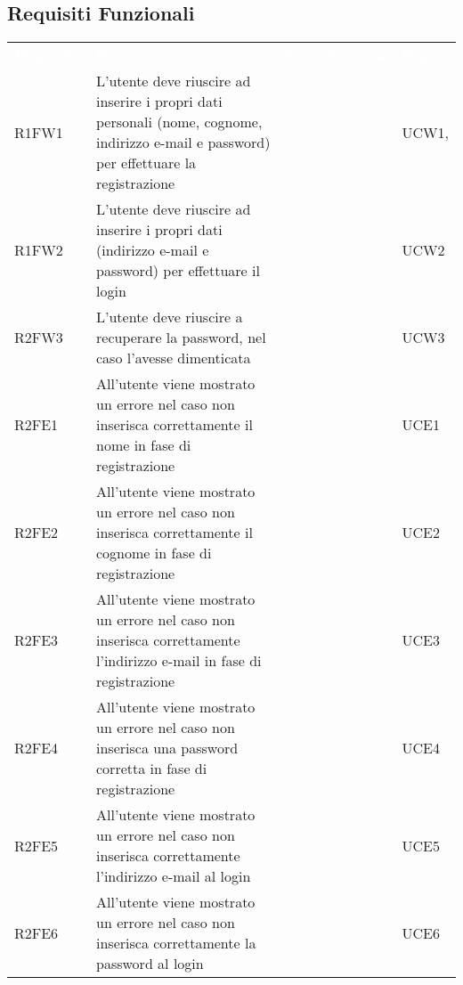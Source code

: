 \subsection{Requisiti Funzionali}


\renewcommand{\arraystretch}{1.5}
\begin{longtable}{ m{}<{\centering}  m{}<{\centering}  m{}<{\centering}  m{}<{\centering}}
	\rowcolor{darkblue}
	\textcolor{white}{\textbf{Requisito}} &\textcolor{white}{\textbf{Descrizione}}& \textcolor{white}{\textbf{Classificazione}} & \textcolor{white}{\textbf{Fonti}}\\ 

	R1FW1 & L’utente deve riuscire ad inserire i propri dati personali (nome, cognome, indirizzo e-mail e password) per effettuare la registrazione & \Ob & UCW1, \Di \\	
	 
	R1FW2 & L’utente deve riuscire ad inserire i propri dati (indirizzo e-mail e password) per effettuare il login & \Ob & UCW2\\	

	R2FW3 & L’utente deve riuscire a recuperare la password, nel caso l’avesse dimenticata & \De & UCW3\\	
	 
	R2FE1 & All’utente viene mostrato un errore nel caso non inserisca correttamente il nome in fase di registrazione & \De & UCE1\\	
	 
 	R2FE2 & All’utente viene mostrato un errore nel caso non inserisca correttamente il cognome in fase di registrazione & \De & UCE2\\	
	 
	R2FE3 & All’utente viene mostrato un errore nel caso non inserisca correttamente l’indirizzo e-mail in fase di registrazione & \De & UCE3\\	

	R2FE4 & All’utente viene mostrato un errore nel caso non inserisca una password corretta in fase di registrazione & \De & UCE4\\	
	
	R2FE5 & All'utente viene mostrato un errore nel caso non inserisca correttamente l'indirizzo e-mail al login & \De & UCE5 \\
	 
	R2FE6 & All'utente viene mostrato un errore nel caso non inserisca correttamente la password al login & \De & UCE6 \\	 
	 

\end{longtable}
